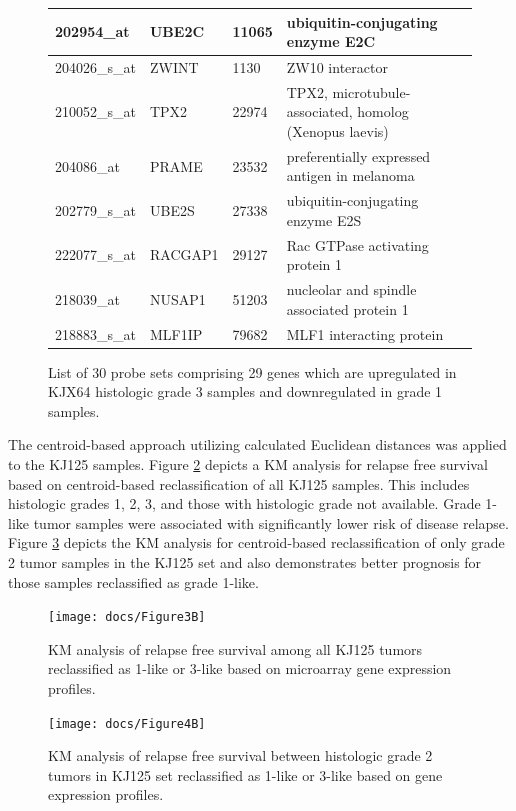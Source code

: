\documentclass[a4paper,10pt]{article}
\begin{document}
\begin{figure}
\begin{tabular}{| l | l | l | l | }
202954\_at & UBE2C & 11065 & ubiquitin-conjugating enzyme E2C\\ \hline 
204026\_s\_at & ZWINT & 1130 & ZW10 interactor\\ \hline 
210052\_s\_at & TPX2 & 22974 & TPX2, microtubule-associated, homolog (Xenopus laevis)\\ \hline 
204086\_at & PRAME & 23532 & preferentially expressed antigen in melanoma\\ \hline 
202779\_s\_at & UBE2S & 27338 & ubiquitin-conjugating enzyme E2S\\ \hline 
222077\_s\_at & RACGAP1 & 29127 & Rac GTPase activating protein 1\\ \hline 
218039\_at & NUSAP1 & 51203 & nucleolar and spindle associated protein 1\\ \hline 
218883\_s\_at & MLF1IP & 79682 & MLF1 interacting protein\\ \hline
\end{tabular}
\caption{List of 30 probe sets comprising 29 genes which are upregulated in KJX64 histologic 
grade 3 samples and downregulated in grade 1 samples.}\label{T1}
\end{figure}


The centroid-based approach utilizing calculated Euclidean distances was applied to the 
KJ125 samples.   Figure \ref{3B} depicts a KM analysis for relapse free survival based on 
centroid-based reclassification of all KJ125 samples. This includes histologic grades 1, 2, 3, 
and those with histologic grade not available.  Grade 1-like tumor samples were associated 
with significantly lower risk of disease relapse.  Figure \ref{4B} depicts the KM analysis for 
centroid-based reclassification of only grade 2 tumor samples in the KJ125 set and 
also demonstrates better prognosis for those samples reclassified as grade 1-like.  

 \begin{figure}
\centering
\texttt{[image: docs/Figure3B]}
\caption{ KM analysis of relapse free survival among all 
KJ125 tumors reclassified as 1-like or 3-like based on 
microarray gene expression profiles.}\label{3B}
\end{figure}


 \begin{figure}
\centering
\texttt{[image: docs/Figure4B]}
\caption{ KM analysis of relapse free survival between 
histologic grade 2 tumors in KJ125 set reclassified as 
1-like or 3-like based on gene expression profiles.}\label{4B}
\end{figure}
\end{document}
